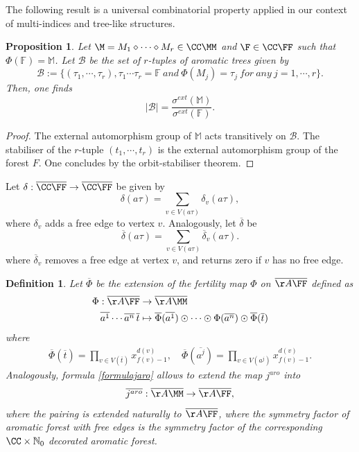 \documentclass[a4paper,11pt]{article}
\newtheorem{definition}[theorem]{Definition}
\newtheorem{proposition}[theorem]{Proposition}
\begin{document}
The following result is a universal combinatorial property applied in our context of multi-indices and tree-like structures.
\begin{proposition}\label{monomial and forest}
Let $\M=M_1\diamond \cdots \diamond M_r\in \CC\MM$ and $\F\in \CC\FF$ such that $\Phi(\mathbb F)=\mathbb M$.
Let $\mathcal B$ be the set of $r$-tuples of aromatic trees given by
\[\mathcal B:= \{(\tau_1,\cdots,\tau_r), \tau_1\cdots \tau_r=\mathbb F \ and \ \Phi(M_j)=\tau_j \ for \ any \ j=1,\cdots,r\}.\]
Then, one finds
\[\vert \mathcal B\vert=\frac{\sigma^{ext}(\mathbb M)}{\sigma^{ext}(\mathbb F)}.\]
\end{proposition}


\begin{proof}
The external automorphism group of $\mathbb M$ acts transitively on $\mathcal B$. The stabiliser of the $r$-tuple $(t_1,\cdots, t_r)$ is the external automorphism group of the forest $F$. One concludes by the orbit-stabiliser theorem.
\end{proof}





Let $\delta: \overline{\CC\FF}\rightarrow \overline{\CC\FF}$ be given by
\[\delta(a\tau)= \sum_{v\in V(a\tau)}\delta_v(a\tau),\]
where $\delta_v$ adds a free edge to vertex $v$.
Analogously, let $\overline{\delta}$ be
\[\overline{\delta}(a\tau)= \sum_{v\in V(a\tau)}\overline{\delta}_v(a\tau).\]
where $\overline{\delta}_v$ removes a free edge at vertex $v$, and returns zero if $v$ has no free edge.

\begin{definition}
Let $\overline{\Phi}$ be the extension of the fertility map $\Phi$ on $\overline{\AA\FF}$ defined as
\begin{align*}
\Phi: \overline{\AA\FF} & \rightarrow \overline{\AA\MM}\\
\overline{a^1}\cdots \overline{a^n}\,\overline{t}& \mapsto \overline{\Phi}(\overline{a^1})\odot \cdots \odot \Phi(\overline{a^n})\odot \overline{\Phi}(\overline{t})
\end{align*}
where
\begin{align*}
\overline{\Phi}(\overline{t})=\prod_{v\in V(\overline{t})}x_{f(v) - 1}^{d(v)}, \quad \overline{\Phi}(\overline{a^j})=\prod_{v\in V(a^j)}x_{f(v)-1}^{d(v)}. 
\end{align*}
Analogously, formula \eqref{formulajaro} allows to extend the map $j^{aro}$ into
\begin{align*}
\overline{j^{aro}}: \overline{\AA\MM} \rightarrow \overline{\AA\FF},
\end{align*}
where the pairing is extended naturally to $\overline{\AA\FF}$, where the symmetry factor of aromatic forest with free edges is the symmetry factor of the corresponding $\CC\times \mathbb N_0$ decorated aromatic forest.
\end{definition}
\end{document}
